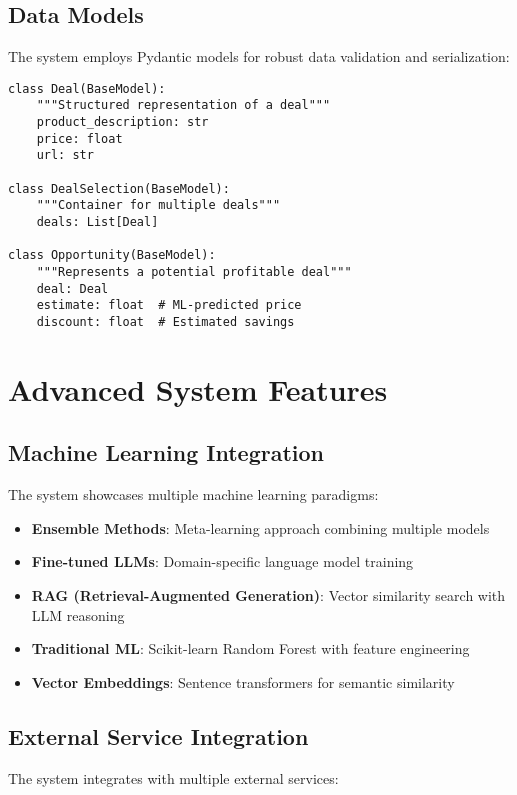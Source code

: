 \subsection{Data Models}

The system employs Pydantic models for robust data validation and serialization:

\begin{lstlisting}[caption=Core Data Models]
class Deal(BaseModel):
    """Structured representation of a deal"""
    product_description: str
    price: float
    url: str

class DealSelection(BaseModel):
    """Container for multiple deals"""
    deals: List[Deal]

class Opportunity(BaseModel):
    """Represents a potential profitable deal"""
    deal: Deal
    estimate: float  # ML-predicted price
    discount: float  # Estimated savings
\end{lstlisting}

\section{Advanced System Features}

\subsection{Machine Learning Integration}

The system showcases multiple machine learning paradigms:

\begin{itemize}
\item \textbf{Ensemble Methods}: Meta-learning approach combining multiple models
\item \textbf{Fine-tuned LLMs}: Domain-specific language model training
\item \textbf{RAG (Retrieval-Augmented Generation)}: Vector similarity search with LLM reasoning
\item \textbf{Traditional ML}: Scikit-learn Random Forest with feature engineering
\item \textbf{Vector Embeddings}: Sentence transformers for semantic similarity
\end{itemize}

\subsection{External Service Integration}

The system integrates with multiple external services:

